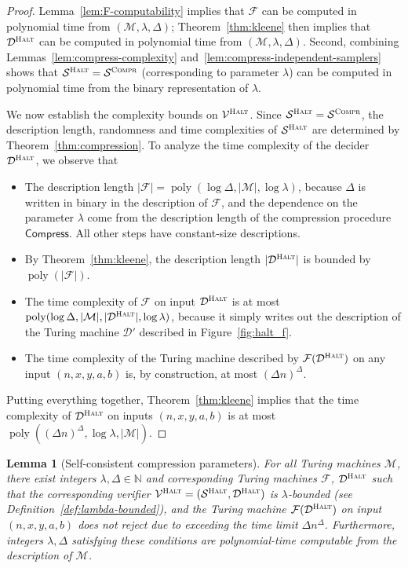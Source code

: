 \documentclass[11pt]{article}
\newtheorem{lemma}[theorem]{Lemma}
\theoremstyle{definition}
\newcommand{\N}{\ensuremath{\mathbb{N}}}
\DeclareMathOperator{\poly}{poly}
\newcommand{\sampler}{\mathcal{S}}
\newcommand{\decider}{\mathcal{D}}
\newcommand{\verifier}{\mathcal{V}}
\newcommand{\compr}{\textsc{Compr}}
\newcommand{\halt}{\textsc{Halt}}
\renewcommand{\cal}[1]{\mathcal{#1}}
\newcommand{\tmstyle}[1]{\ensuremath{\mathsf{#1}}}
\newcommand{\Compress}{\tmstyle{Compress}}
\begin{document}
\begin{proof}
  Lemma~\ref{lem:F-computability} implies that $\cal{F}$ can be computed in
  polynomial time from $(\cal{M},\lambda,\Delta)$; Theorem~\ref{thm:kleene} then
  implies that $\decider^\halt$ can be computed in polynomial time from
  $(\cal{M},\lambda,\Delta)$.
  Second, combining Lemmas~\ref{lem:compress-complexity}
  and~\ref{lem:compress-independent-samplers} shows that $\sampler^\halt =
  \sampler^\compr$ (corresponding to parameter $\lambda$) can be computed in
  polynomial time from the binary representation of $\lambda$.

  We now establish the complexity bounds on $\verifier^\halt$.
  Since $\sampler^\halt = \sampler^\compr$, the description length, randomness
  and time complexities of $\sampler^\halt$ are determined by
  Theorem~\ref{thm:compression}.
  To analyze the time complexity of the decider $\decider^\halt$, we observe
  that
  \begin{itemize}
	\item The description length $|\cal{F}| = \poly(\log \Delta,|\cal{M}|,\log
    \lambda)$, because $\Delta$ is written in binary in the description of
    $\cal{F}$, and the dependence on the parameter $\lambda$ come from the
    description length of the compression procedure $\Compress$.
    All other steps have constant-size descriptions.
  \item By Theorem~\ref{thm:kleene}, the description length $|\decider^\halt|$
    is bounded by $\poly(|\cal{F}|)$.
	\item The time complexity of $\cal{F}$ on input $\decider^\halt$ is at most
    $\poly(\log \Delta,|\cal{M}|,|\decider^\halt|,\log \lambda)$, because it
    simply writes out the description of the Turing machine $\cal{D}'$ described
    in Figure~\ref{fig:halt_f}.
	\item The time complexity of the Turing machine described by
    $\cal{F}(\decider^\halt)$ on any input $(n,x,y,a,b)$ is, by construction, at
    most $(\Delta n)^\Delta$.
  \end{itemize}
  Putting everything together, Theorem~\ref{thm:kleene} implies that the time
  complexity of $\decider^\halt$ on inputs $(n,x,y,a,b)$ is at most
  $\poly((\Delta n)^\Delta,\log \lambda, |\cal{M}|)$.
\end{proof}

\begin{lemma}[Self-consistent compression parameters]
  \label{lem:good_compression_params}
	For all Turing machines $\cal{M}$, there exist integers $\lambda, \Delta \in
  \N$ and corresponding Turing machines $\cal{F}$, $\decider^\halt$ such that
  the corresponding verifier $\verifier^\halt = (\sampler^\halt,\decider^\halt)$
  is $\lambda$-bounded (see Definition~\ref{def:lambda-bounded}), and the Turing
  machine $\cal{F}(\decider^\halt)$ on input $(n,x,y,a,b)$ does not reject due
  to exceeding the time limit $\Delta n^\Delta$.
  Furthermore, integers $\lambda, \Delta$ satisfying these conditions are
  polynomial-time computable from the description of $\cal{M}$.
\end{lemma}
\end{document}
